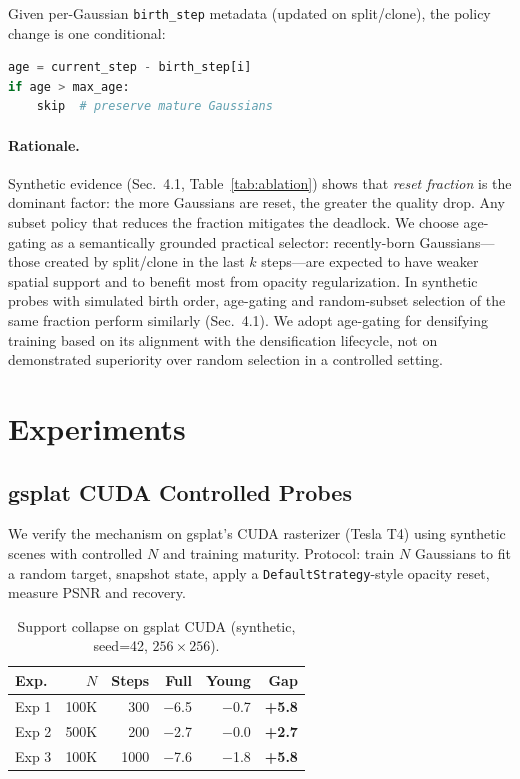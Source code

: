 \documentclass[runningheads]{llncs}
\newcommand{\DefaultStrategy}{\texttt{Default\allowbreak Strategy}}
\begin{document}
Given per-Gaussian \texttt{birth\_step} metadata (updated on split/clone), the policy change is one conditional:

\begin{lstlisting}[language=Python]
age = current_step - birth_step[i]
if age > max_age:
    skip  # preserve mature Gaussians
\end{lstlisting}

\paragraph{Rationale.} Synthetic evidence (Sec.~4.1, Table~\ref{tab:ablation}) shows that \emph{reset fraction} is the dominant factor: the more Gaussians are reset, the greater the quality drop. Any subset policy that reduces the fraction mitigates the deadlock. We choose age-gating as a semantically grounded practical selector: recently-born Gaussians---those created by split/clone in the last $k$ steps---are expected to have weaker spatial support and to benefit most from opacity regularization. In synthetic probes with simulated birth order, age-gating and random-subset selection of the same fraction perform similarly (Sec.~4.1). We adopt age-gating for densifying training based on its alignment with the densification lifecycle, not on demonstrated superiority over random selection in a controlled setting.

\section{Experiments}

\subsection{gsplat CUDA Controlled Probes}

We verify the mechanism on gsplat's CUDA rasterizer (Tesla T4) using synthetic scenes with controlled $N$ and training maturity. Protocol: train $N$ Gaussians to fit a random target, snapshot state, apply a \DefaultStrategy{}-style opacity reset, measure PSNR and recovery.

\begin{table}[t]
\centering
\small
\setlength{\tabcolsep}{3pt}
\caption{Support collapse on gsplat CUDA (synthetic, seed=42, $256{\times}256$).}
\label{tab:cuda}
\begin{tabular}{@{}lrrrrr@{}}
\toprule
Exp. & $N$ & Steps & Full & Young & Gap \\
\midrule
Exp 1 & 100K & 300 & $-$6.5 & $-$0.7 & \textbf{+5.8} \\
Exp 2 & 500K & 200 & $-$2.7 & $-$0.0 & \textbf{+2.7} \\
Exp 3 & 100K & 1000 & $-$7.6 & $-$1.8 & \textbf{+5.8} \\
\bottomrule
\end{tabular}
\end{table}
\end{document}
